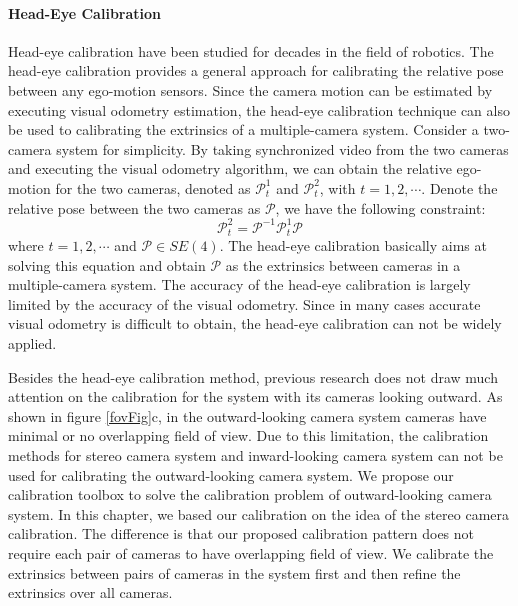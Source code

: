 \documentclass{report}
\begin{document}
\paragraph{Head-Eye Calibration}
Head-eye calibration have been studied for decades in the field of robotics. The head-eye calibration provides a general approach for calibrating the relative pose between any ego-motion sensors. Since the camera motion can be estimated by executing visual odometry estimation, the head-eye calibration technique can also be used to calibrating the extrinsics of a multiple-camera system. Consider a two-camera system for simplicity. By taking synchronized video from the two cameras and executing the visual odometry algorithm, we can obtain the relative ego-motion for the two cameras, denoted as $\mathcal{P}_t^1$ and $\mathcal{P}_t^2$, with $t = 1, 2, \cdots$. Denote the relative pose between the two cameras as $\mathcal{P}$, we have the following constraint: 
\begin{equation}
\mathcal{P}_t^2 = \mathcal{P}^{-1} \mathcal{P}_t^1 \mathcal{P}
\end{equation}
where $t = 1, 2, \cdots$ and $\mathcal{P} \in {SE}(4)$. The head-eye calibration basically aims at solving this equation and obtain $\mathcal{P}$ as the extrinsics between cameras in a multiple-camera system. The accuracy of the head-eye calibration is largely limited by the accuracy of the visual odometry. Since in many cases accurate visual odometry is difficult to obtain, the head-eye calibration can not be widely applied. 

\bigskip
Besides the head-eye calibration method, previous research does not draw much attention on the calibration for the system with its cameras looking outward. As shown in figure \ref{fovFig}c, in the outward-looking camera system cameras have minimal or no overlapping field of view. Due to this limitation, the calibration methods for stereo camera system and inward-looking camera system can not be used for calibrating the outward-looking camera system. We propose our calibration toolbox to solve the calibration problem of outward-looking camera system. 
In this chapter, we based our calibration on the idea of the stereo camera calibration. The difference is that our proposed calibration pattern does not require each pair of cameras to have overlapping field of view. We calibrate the extrinsics between pairs of cameras in the system first and then refine the extrinsics over all cameras. 
\end{document}
